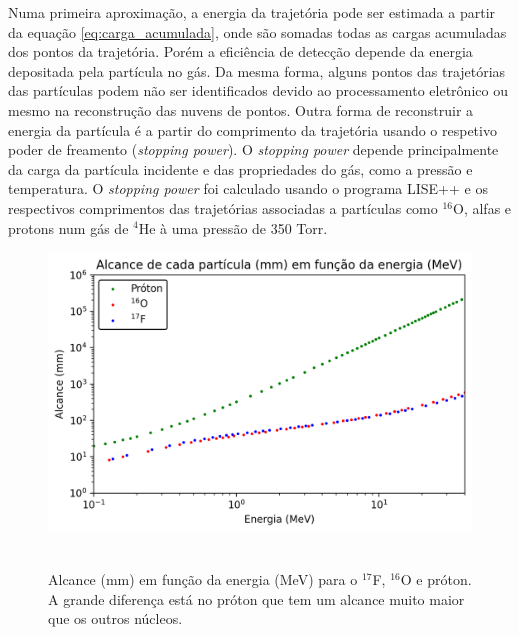 \documentclass[a4paper,12pt,oneside]{book}
\begin{document}
\par Numa primeira aproximação, a energia da trajetória pode ser estimada a partir da equação \ref{eq:carga_acumulada}, onde são somadas todas as cargas acumuladas dos pontos da trajetória. Porém a eficiência de detecção depende da energia depositada pela partícula no gás. Da mesma forma, alguns pontos das trajetórias das partículas podem não ser identificados devido ao processamento eletrônico ou mesmo na reconstrução das nuvens de pontos. Outra forma de reconstruir a energia da partícula é a partir do comprimento da trajetória usando o respetivo poder de freamento (\textit{stopping power}). O \textit{stopping power} depende principalmente da carga da partícula incidente e das propriedades do gás, como a pressão e temperatura. O \textit{stopping power} foi calculado usando o programa LISE++\cite{lise++} e os respectivos comprimentos das trajetórias associadas a partículas como $^{16}$O, alfas e protons num gás de $^4$He à uma pressão de 350 Torr.


 \begin{figure}[H]
     \centering
     \includegraphics[scale = 0.85]{figs/alcance_vs_energia_2.png}\
     \caption{Alcance (mm) em função da energia (MeV) para o $^{17}$F, $^{16}$O e próton. A grande diferença está no próton que tem um alcance muito maior que os outros núcleos.}
     \label{fig:alcance_vs_energia}
 \end{figure}
\end{document}
